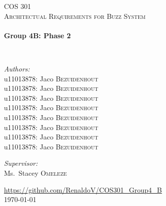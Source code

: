 
\begin{titlepage}
\begin{center}


\textsc{\LARGE COS 301}\\[1.5cm]

\textsc{\large Architectual Requirements for Buzz System}\\[0.5cm]

\HRule \\[0.4cm]
{ \huge \bfseries Group 4B: Phase 2 \\[0.4cm] }

\HRule \\[1.5cm]

\noindent
\begin{minipage}{0.4\textwidth}
\begin{flushleft} \large
\emph{Authors:}\\
u11013878: Jaco \textsc{Bezuidenhout}\\
u11013878: Jaco \textsc{Bezuidenhout}\\
u11013878: Jaco \textsc{Bezuidenhout}\\
u11013878: Jaco \textsc{Bezuidenhout}\\
u11013878: Jaco \textsc{Bezuidenhout}\\
u11013878: Jaco \textsc{Bezuidenhout}\\
u11013878: Jaco \textsc{Bezuidenhout}\\
u11013878: Jaco \textsc{Bezuidenhout}

\end{flushleft}
\end{minipage}
\begin{minipage}{0.4\textwidth}
\begin{flushright} \large
\emph{Supervisor:} \\
Ms.~Stacey \textsc{Omeleze}
\end{flushright}
\end{minipage}





\vfill

\url{ https://github.com/RenaldoV/COS301_Group4_B}\\
{\large \today}

\end{center}
\end{titlepage}
